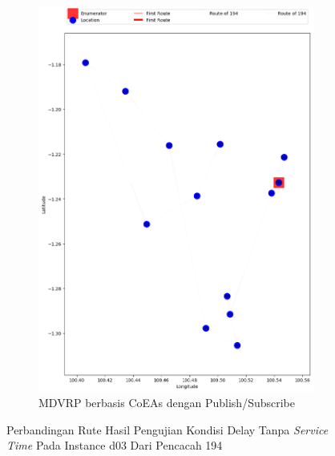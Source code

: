 \begin{figure}[H]\ContinuedFloat
	\centering
	\begin{subfigure}[t]{\textwidth}
		\centering
		\includegraphics[width=\textwidth]{Resources/Images/delayed_3/real_m15_n100_delayed_3_194_pubsub_coes}
		\caption{MDVRP berbasis CoEAs dengan Publish/Subscribe}
		\label{fig:real_m15_n100_delayed_3_194_pubsub_coes}
	\end{subfigure}
	\caption{Perbandingan Rute Hasil Pengujian Kondisi Delay Tanpa \textit{Service Time} Pada Instance d03 Dari Pencacah 194}
	\label{fig:real_m15_n100_delayed_3_194_contd}
\end{figure}


